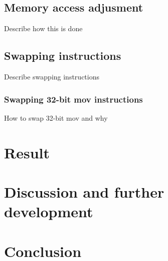 \documentclass[11pt,twoside]{eitExjobb}
\begin{document}
\section{Memory access adjusment}
Describe how this is done

\section{Swapping instructions}
Describe swapping instructions

\subsection{Swapping 32-bit mov instructions}
How to swap 32-bit mov and why







\chapter{Result}

\chapter{Discussion and further development}

\chapter{Conclusion}
{}


\end{document}

